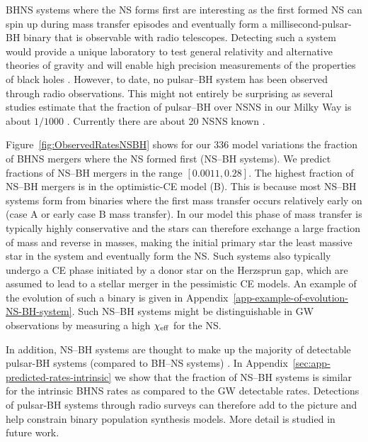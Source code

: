 \documentclass[twocolumn]{aastex63}
\newcommand\bhnsSingle{BHNS\xspace}
\newcommand{\Nmodels}{\ensuremath{336}\xspace}
\begin{document}
\bhnsSingle systems where the \ac{NS} forms first are interesting as the first formed \ac{NS} can spin up during mass transfer episodes and eventually form a millisecond-pulsar-\ac{BH} binary that is observable with radio telescopes. 
Detecting  such a system would provide a unique laboratory to test general relativity and alternative theories of gravity \citep{Wex:1998wt,KRAMER2004993, 2014arXiv1402.5594W} and will enable high precision  measurements of the  properties of black holes    \citep{1975ApJ...198L..27B,1975SvAL....1....2B}. However, to date, no pulsar--BH system has been observed through radio observations. This might not entirely be surprising as several studies estimate that the fraction of   pulsar--\ac{BH}  over \ac{NSNS} in our Milky Way is about $1/1000$ \citep{2005ApJ...628..343P}. Currently there are about 20 \ac{NSNS} known \citep[e.g.][]{tauris2017formation,2019ApJ...876...18F}. 


Figure~\ref{fig:ObservedRatesNSBH} shows for our \Nmodels model variations the fraction of \bhnsSingle mergers where the \ac{NS} formed first (NS--BH systems).  We predict fractions of NS--BH mergers  in  the range $[0.0011, 0.28]$. 
The highest fraction of NS--BH mergers is in the optimistic-\ac{CE} model (B). This is because most NS--BH systems form from binaries where the first mass transfer occurs relatively early on (case A or early case B mass transfer). In our model this phase of mass transfer is typically highly conservative and the stars can therefore exchange a large fraction of mass and reverse in masses, making the initial primary star the least massive star in the system and eventually form the \ac{NS}. Such systems also typically undergo a \ac{CE} phase initiated by a donor star on the Herzsprun gap, which are assumed to lead to a stellar merger in the pessimistic \ac{CE} models. An example of the evolution of such a binary is given in Appendix~\ref{app-example-of-evolution-NS-BH-system}. Such NS--BH systems might be distinguishable in \ac{GW} observations by measuring a high $\chi_{\rm{eff}}$ for the \ac{NS}. 

In addition,  NS--BH systems are thought to make up the majority of detectable pulsar-BH systems (compared to BH--NS systems) \citep{2020MNRAS.494.1587C}. In Appendix~\ref{sec:app-predicted-rates-intrinsic} we show that the fraction of NS--BH systems is similar for the intrinsic \bhnsSingle rates as compared to the \ac{GW} detectable rates. Detections of pulsar-BH systems through radio surveys can therefore add to the picture and help constrain  binary population synthesis models.   More detail is studied in future work.
\end{document}

